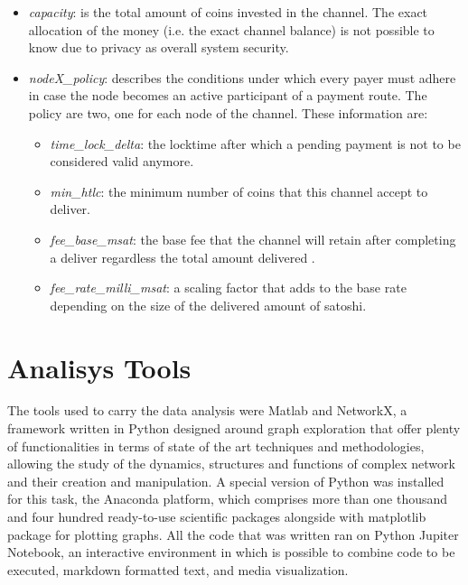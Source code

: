 	\begin{itemize}
		\item \textit{capacity}: is the total amount of coins invested in the channel. The exact allocation of the money (i.e. the exact channel balance) is not possible to know due to privacy as overall system security.
		
		\item \textit{nodeX\_policy}: describes the conditions under which every payer must adhere in case the node becomes an active participant of a payment route. The policy are two, one for each node of the channel. These information are:
		\begin{itemize}
			\item \textit{time\_lock\_delta}: the locktime after which a pending payment is not to be considered valid anymore.
			
			\item \textit{min\_htlc}: the minimum number of coins that this channel accept to deliver.
			
			\item \textit{fee\_base\_msat}: the base fee that the channel will retain after completing a deliver regardless the total amount delivered .
			
			\item \textit{fee\_rate\_milli\_msat}: a scaling factor that adds to the base rate depending on the size of the delivered amount of satoshi.
		\end{itemize}
	\end{itemize}
	
	
	\section{Analisys Tools}
	
	The tools used to carry the data analysis were Matlab and NetworkX, a framework written in Python designed around graph exploration that offer plenty of functionalities in terms of state of the art techniques and methodologies, allowing the study of the dynamics, structures and functions of complex network and their creation and manipulation. A special version of Python was installed for this task, the Anaconda platform, which comprises more than one thousand and four hundred ready-to-use scientific packages alongside with matplotlib package for plotting graphs. All the code that was written ran on Python Jupiter Notebook, an interactive environment in which is possible to combine code to be executed, markdown formatted text, and media visualization.
